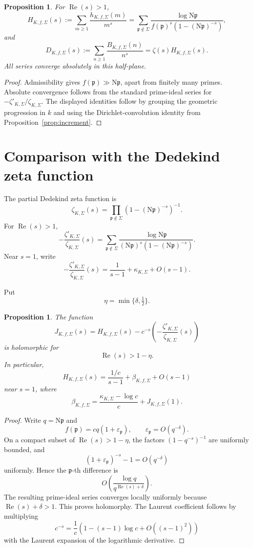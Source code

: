 \documentclass[11pt]{article}
\newtheorem{proposition}[theorem]{Proposition}
\newcommand{\Norm}{\mathrm N}
\newcommand{\RePart}{\operatorname{Re}}
\begin{document}
\begin{proposition}\label{prop:dirichlet}
For \(\RePart(s)>1\),
\[
H_{K,f,\Sigma}(s)
:=
\sum_{m\ge1}
\frac{h_{K,f,\Sigma}(m)}{m^s}
=
\sum_{\mathfrak p\notin\Sigma}
\frac{\log\Norm\mathfrak p}
{f(\mathfrak p)^s
 (1-(\Norm\mathfrak p)^{-s})},
\]
and
\[
D_{K,f,\Sigma}(s)
:=
\sum_{n\ge1}
\frac{B_{K,f,\Sigma}(n)}{n^s}
=
\zeta(s)H_{K,f,\Sigma}(s).
\]
All series converge absolutely in this half-plane.
\end{proposition}

\begin{proof}
Admissibility gives \(f(\mathfrak p)\gg\Norm\mathfrak p\), apart from
finitely many primes.  Absolute convergence follows from the standard
prime-ideal series for
\(-\zeta'_{K,\Sigma}/\zeta_{K,\Sigma}\).  The displayed identities
follow by grouping the geometric progression in \(k\) and using the
Dirichlet-convolution identity from
Proposition~\ref{prop:increment}.
\end{proof}

\section{Comparison with the Dedekind zeta function}
\label{sec:zeta-comparison}

The partial Dedekind zeta function is
\[
\zeta_{K,\Sigma}(s)
=
\prod_{\mathfrak p\notin\Sigma}
(1-(\Norm\mathfrak p)^{-s})^{-1}.
\]
For \(\RePart(s)>1\),
\[
-\frac{\zeta'_{K,\Sigma}}{\zeta_{K,\Sigma}}(s)
=
\sum_{\mathfrak p\notin\Sigma}
\frac{\log\Norm\mathfrak p}
{(\Norm\mathfrak p)^s
 (1-(\Norm\mathfrak p)^{-s})}.
\]
Near \(s=1\), write
\[
-\frac{\zeta'_{K,\Sigma}}{\zeta_{K,\Sigma}}(s)
=
\frac1{s-1}
+
\kappa_{K,\Sigma}
+
O(s-1).
\]

Put
\[
\eta=\min\{\delta,\tfrac12\}.
\]

\begin{proposition}\label{prop:J}
The function
\[
J_{K,f,\Sigma}(s)
=
H_{K,f,\Sigma}(s)
-
c^{-s}
\left(
-\frac{\zeta'_{K,\Sigma}}{\zeta_{K,\Sigma}}(s)
\right)
\]
is holomorphic for
\[
\RePart(s)>1-\eta.
\]
In particular,
\[
H_{K,f,\Sigma}(s)
=
\frac{1/c}{s-1}
+
\beta_{K,f,\Sigma}
+
O(s-1)
\]
near \(s=1\), where
\[
\beta_{K,f,\Sigma}
=
\frac{\kappa_{K,\Sigma}-\log c}{c}
+
J_{K,f,\Sigma}(1).
\]
\end{proposition}

\begin{proof}
Write \(q=\Norm\mathfrak p\) and
\[
f(\mathfrak p)=cq(1+\varepsilon_{\mathfrak p}),
\qquad
\varepsilon_{\mathfrak p}=O(q^{-\delta}).
\]
On a compact subset of \(\RePart(s)>1-\eta\), the factors
\((1-q^{-s})^{-1}\) are uniformly bounded, and
\[
(1+\varepsilon_{\mathfrak p})^{-s}-1
=
O(q^{-\delta})
\]
uniformly.  Hence the \(\mathfrak p\)-th difference is
\[
O\!\left(
\frac{\log q}{q^{\RePart(s)+\delta}}
\right).
\]
The resulting prime-ideal series converges locally uniformly because
\(\RePart(s)+\delta>1\).  This proves holomorphy.  The Laurent
coefficient follows by multiplying
\[
c^{-s}
=
\frac1c
\left(
1-(s-1)\log c+O((s-1)^2)
\right)
\]
with the Laurent expansion of the logarithmic derivative.
\end{proof}
\end{document}
